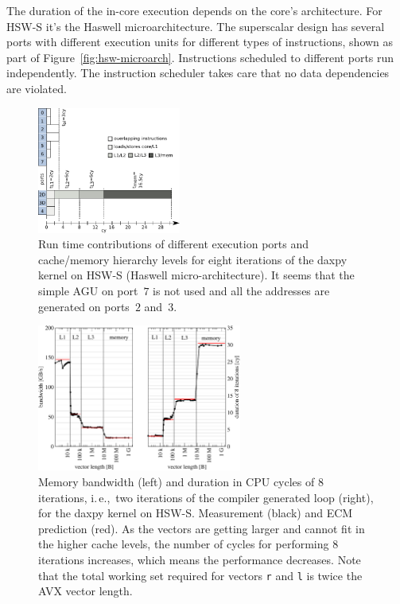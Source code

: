 
The duration of the in-core execution depends on the core's architecture.
For HSW-S it's the Haswell microarchitecture.
The superscalar design has several ports with different execution units for
different types of instructions, shown as part of Figure~\ref{fig:hsw-microarch}.
Instructions scheduled to different ports run independently.
The instruction scheduler takes care that no data dependencies are violated.

\begin{figure}[t]
  \centering
  \includegraphics[width=0.42\textwidth,clip=true]{images/ecm-hsw-daxpy}
  \caption{Run time contributions of different execution ports and cache/memory
hierarchy levels for eight iterations of the daxpy kernel on HSW-S (Haswell micro-architecture). It seems that the simple AGU on port~$7$ is not used and all the addresses are generated on ports~$2$ and~$3$.}
  \label{fig:daxpy:ecm}
\end{figure}

\begin{figure}[t]
  \centering
  \includegraphics[width=0.60\textwidth,clip=true]{images/daxpy-bw-hasep1-f-2_3-w-cy}
   \caption{Memory bandwidth (left) and duration in CPU cycles of 8 iterations, i.\,e.,\ two iterations of the
compiler generated loop (right), for the daxpy kernel on HSW-S.
   Measurement (black) and ECM prediction (red).
   As the vectors are getting larger and cannot fit in the higher cache levels, the number of cycles for performing 8 iterations increases, which means the performance decreases.
   Note that the total
working set required for vectors
\protect\texttt{r} and \texttt{l} is twice the AVX vector length.}
  \label{fig:daxpy:perf}
\end{figure}

